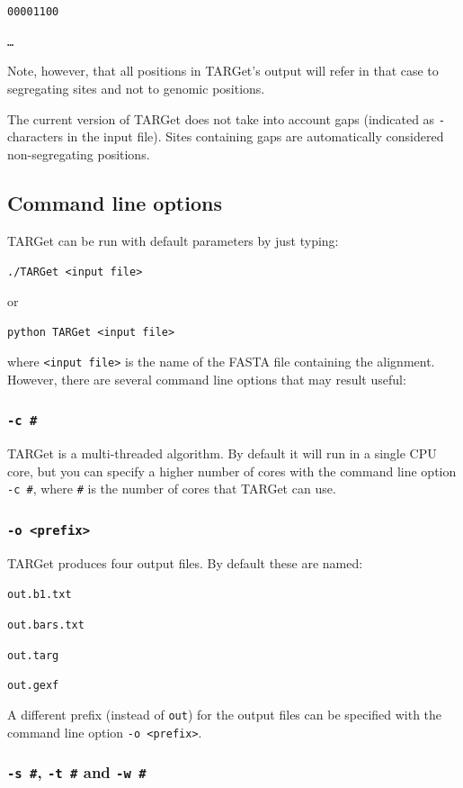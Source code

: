 \documentclass[12pt]{article}
\begin{document}
\texttt{00001100}

\texttt{\ldots}

\noindent Note, however, that all positions in TARGet's output will refer in that case to segregating sites and not to genomic positions.

The current version of TARGet does not take into account gaps (indicated as \texttt{-} characters in the input file). Sites containing gaps are automatically considered non-segregating positions.

\subsection*{Command line options}

TARGet can be run with default parameters by just typing:

\texttt{./TARGet <input file>}

\noindent or

\texttt{python TARGet <input file>}

\noindent where \texttt{<input file>} is the name of the FASTA file containing the alignment. However, there are several command line options that may result useful:

\subsubsection*{\texttt{-c \#}}

TARGet is a multi-threaded algorithm. By default it will run in a single CPU core, but you can specify a higher number of cores with the command line option \texttt{-c \#}, where \texttt{\#} is the number of cores that TARGet can use.

\subsubsection*{\texttt{-o <prefix>}}

TARGet produces four output files. By default these are named:

\texttt{out.b1.txt}

\texttt{out.bars.txt} 

\texttt{out.targ}

\texttt{out.gexf}

\noindent A different prefix (instead of \texttt{out}) for the output files can be specified with the command line option \texttt{-o <prefix>}.

\subsubsection*{\texttt{-s \#}, \texttt{-t \#} and \texttt{-w \#}}
\end{document}
